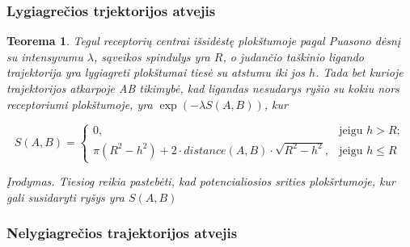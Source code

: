 \documentclass[10pt]{article}
\newtheorem{thm}{Teorema}
\begin{document}
\subsubsection{Lygiagrečios trjektorijos atvejis}

\begin{thm}\label{thm:2}
Tegul receptorių centrai išsidėstę plokštumoje  pagal Puasono dėsnį su intensyvumu $\lambda$,  sąveikos spindulys yra $R$, o judančio taškinio ligando trajektorija yra lygiagreti plokštumai tiesė su atstumu iki jos  $ h $. Tada bet kurioje trajektorijos atkarpoje AB tikimybė, kad ligandas nesudarys ryšio su kokiu nors receptoriumi plokštumoje, yra $ \exp( -\lambda S(A,B)) $, kur 

\[
S(A,B) =
\begin{cases}
0, & \text{jeigu } h>R; \\

\pi(R^2-h^2) + 2 \cdot distance(A,B) \cdot \sqrt{R^2-h^2}, & 
 \text{jeigu }  h \leqslant R

\end{cases}
\]

Įrodymas. Tiesiog reikia pastebėti, kad potencialiosios srities plokšrtumoje, kur gali susidaryti ryšys yra $ S(A,B) $

\end{thm}

\subsubsection*{Nelygiagrečios trajektorijos atvejis}
\end{document}
